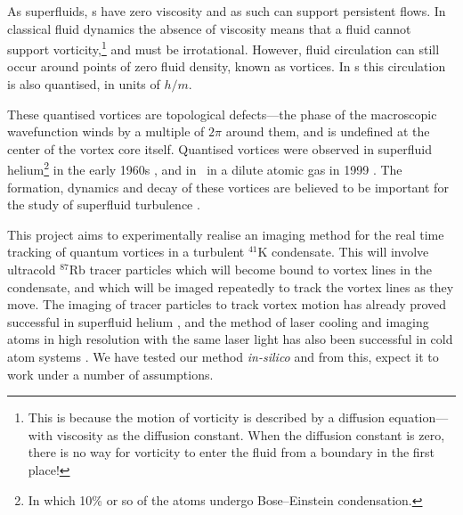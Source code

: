 As superfluids, \bec s have zero viscosity and as such can support persistent flows. In classical fluid dynamics the absence of viscosity means that a fluid cannot support vorticity,\footnote{This is because the motion of vorticity is described by a diffusion equation---with viscosity as the diffusion constant. When the diffusion constant is zero, there is no way for vorticity to enter the fluid from a boundary in the first place!} and must be irrotational. However, fluid circulation can still occur around points of zero fluid density, known as vortices. In \bec s this circulation is also quantised, in units of $h/m$.

These quantised vortices are topological defects---the phase of the macroscopic wavefunction winds by a multiple of $2\pi$ around them, and is undefined at the center of the vortex core itself.  Quantised vortices were observed in superfluid helium\footnote{In which 10\% or so of the atoms undergo Bose--Einstein condensation.} in the early 1960s \cite{vinen_detection_1961}, and in \bec\ in a dilute atomic gas in 1999 \cite{matthews_vortices_1999}. The formation, dynamics and decay of these vortices are believed to be important for the study of superfluid turbulence \cite{barenghi_quantized_2001}.

This project aims to experimentally realise an imaging method for the real time tracking of quantum vortices in a turbulent $^{41}$K condensate. This will involve ultracold $^{87}$Rb tracer particles which will become bound to vortex lines in the condensate, and which will be imaged repeatedly to track the vortex lines as they move. The imaging of tracer particles to track vortex motion has already proved successful in superfluid helium \cite{bewley_generation_2009, bewley_superfluid_2006, packard_vortex_1982}, and the method of laser cooling and imaging atoms in high resolution with the same laser light has also been successful in cold atom systems \cite{bakr_quantum_2009}. We have tested our method \textit{in-silico} \cite{billington_particle_2010} and from this, expect it to work under a number of assumptions.

